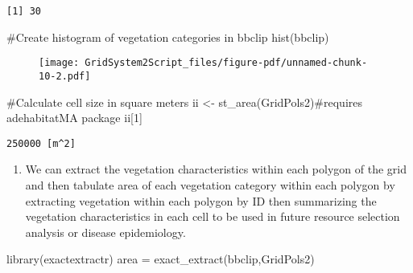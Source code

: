 \documentclass[
  letterpaper,
]{book}
\newenvironment{Shaded}{\begin{snugshade}}{\end{snugshade}}
\newcommand{\CommentTok}[1]{\textcolor[rgb]{0.37,0.37,0.37}{#1}}
\newcommand{\DecValTok}[1]{\textcolor[rgb]{0.68,0.00,0.00}{#1}}
\newcommand{\FunctionTok}[1]{\textcolor[rgb]{0.28,0.35,0.67}{#1}}
\newcommand{\NormalTok}[1]{\textcolor[rgb]{0.00,0.23,0.31}{#1}}
\newcommand{\OtherTok}[1]{\textcolor[rgb]{0.00,0.23,0.31}{#1}}
\providecommand{\tightlist}{%
  \setlength{\itemsep}{0pt}\setlength{\parskip}{0pt}}\usepackage{longtable,booktabs,array}
\begin{document}
\begin{verbatim}
[1] 30
\end{verbatim}

\begin{Shaded}
\begin{Highlighting}[]
\CommentTok{\#Create histogram of vegetation categories in bbclip}
\FunctionTok{hist}\NormalTok{(bbclip)}
\end{Highlighting}
\end{Shaded}

\begin{figure}[H]

{\centering \texttt{[image: GridSystem2Script\_files/figure-pdf/unnamed-chunk-10-2.pdf]}

}

\end{figure}

\begin{Shaded}
\begin{Highlighting}[]
\CommentTok{\#Calculate cell size in square meters}
\NormalTok{ii }\OtherTok{\textless{}{-}} \FunctionTok{st\_area}\NormalTok{(GridPols2)}\CommentTok{\#requires adehabitatMA package}
\NormalTok{ii[}\DecValTok{1}\NormalTok{]}
\end{Highlighting}
\end{Shaded}

\begin{verbatim}
250000 [m^2]
\end{verbatim}

\begin{enumerate}
\def\labelenumi{\arabic{enumi}.}
\setcounter{enumi}{11}
\tightlist
\item
  We can extract the vegetation characteristics within each polygon of
  the grid and then tabulate area of each vegetation category within
  each polygon by extracting vegetation within each polygon by ID then
  summarizing the vegetation characteristics in each cell to be used in
  future resource selection analysis or disease epidemiology.
\end{enumerate}

\begin{Shaded}
\begin{Highlighting}[]
\FunctionTok{library}\NormalTok{(exactextractr)}
\NormalTok{area }\OtherTok{=} \FunctionTok{exact\_extract}\NormalTok{(bbclip,GridPols2)}
\end{Highlighting}
\end{Shaded}
\end{document}
